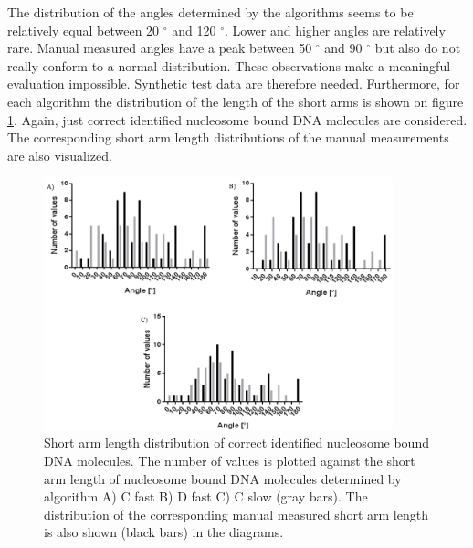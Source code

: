 \documentclass{article}
\begin{document}
The distribution of the angles determined by the algorithms seems to be relatively equal between 20 $^\circ$ and 120 $^\circ$. Lower and higher angles are relatively rare. Manual measured angles have a peak between 50 $^\circ$ and 90 $^\circ$ but also do not really conform to a normal distribution. These observations make a meaningful evaluation impossible. Synthetic test data are therefore needed. Furthermore, for each algorithm the distribution of the length of the short arms is shown on figure \ref{fig: validation7}. Again, just correct identified nucleosome bound DNA molecules are considered. The corresponding short arm length distributions of the manual measurements are also visualized.
%
\begin{figure}[!htb]
	\begin{center}
		\includegraphics[width = 0.9\textwidth]{validation7}
	\end{center}
	\caption{Short arm length distribution of correct identified nucleosome bound DNA molecules. The number of values is plotted against the short arm length of nucleosome bound DNA molecules determined by algorithm A) C fast B) D fast C) C slow (gray bars). The distribution of the corresponding manual measured short arm length is also shown (black bars) in the diagrams.}
	\label{fig: validation7} %
\end{figure}
\end{document}
